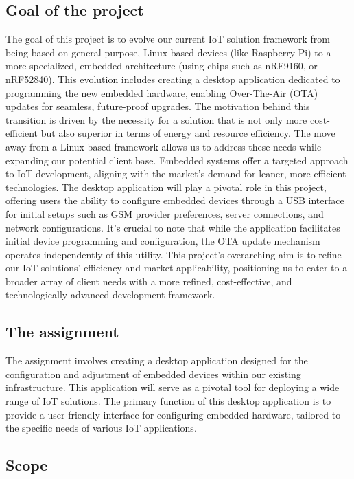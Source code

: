 \documentclass[a4paper, 11pt]{article}
\begin{document}
\subsection{Goal of the project}
The goal of this project is to evolve our current IoT solution framework from being based on general-purpose, Linux-based devices (like Raspberry Pi) to a more specialized, embedded architecture (using chips such as nRF9160, or nRF52840). This evolution includes creating a desktop application dedicated to programming the new embedded hardware, enabling Over-The-Air (OTA) updates for seamless, future-proof upgrades.
\smallbreak
The motivation behind this transition is driven by the necessity for a solution that is not only more cost-efficient but also superior in terms of energy and resource efficiency. The move away from a Linux-based framework allows us to address these needs while expanding our potential client base. Embedded systems offer a targeted approach to IoT development, aligning with the market's demand for leaner, more efficient technologies.
\smallbreak
The desktop application will play a pivotal role in this project, offering users the ability to configure embedded devices through a USB interface for initial setups such as GSM provider preferences, server connections, and network configurations. It's crucial to note that while the application facilitates initial device programming and configuration, the OTA update mechanism operates independently of this utility.
\smallbreak
This project's overarching aim is to refine our IoT solutions' efficiency and market applicability, positioning us to cater to a broader array of client needs with a more refined, cost-effective, and technologically advanced development framework.

\subsection{The assignment}
The assignment involves creating a desktop application designed for the configuration and adjustment of embedded devices within our existing infrastructure. This application will serve as a pivotal tool for deploying a wide range of IoT solutions. The primary function of this desktop application is to provide a user-friendly interface for configuring embedded hardware, tailored to the specific needs of various IoT applications.

\subsection{Scope}
\end{document}
